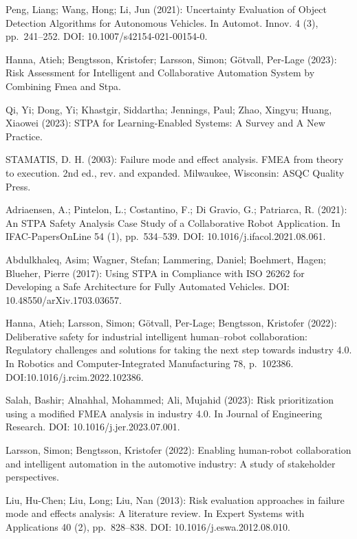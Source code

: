 \begin{thebibliography}{99}
 Peng, Liang; Wang, Hong; Li, Jun (2021): Uncertainty Evaluation of Object Detection Algorithms for Autonomous Vehicles. In Automot. Innov. 4 (3), pp. 241–252. DOI: 10.1007/s42154-021-00154-0.

 Hanna, Atieh; Bengtsson, Kristofer; Larsson, Simon; Götvall, Per-Lage (2023): Risk Assessment for Intelligent and Collaborative Automation System by Combining Fmea and Stpa.

 Qi, Yi; Dong, Yi; Khastgir, Siddartha; Jennings, Paul; Zhao, Xingyu; Huang, Xiaowei (2023): STPA for Learning-Enabled Systems: A Survey and A New Practice.

 STAMATIS, D. H. (2003): Failure mode and effect analysis. FMEA from theory to execution. 2nd ed., rev. and expanded. Milwaukee, Wisconsin: ASQC Quality Press.

 Adriaensen, A.; Pintelon, L.; Costantino, F.; Di Gravio, G.; Patriarca, R. (2021): An STPA Safety Analysis Case Study of a Collaborative Robot Application. In IFAC-PapersOnLine 54 (1), pp. 534–539. DOI: 10.1016/j.ifacol.2021.08.061.

  Abdulkhaleq, Asim; Wagner, Stefan; Lammering, Daniel; Boehmert, Hagen; Blueher, Pierre (2017): Using STPA in Compliance with ISO 26262 for Developing a Safe Architecture for Fully Automated Vehicles. DOI: 10.48550/arXiv.1703.03657.

 Hanna, Atieh; Larsson, Simon; Götvall, Per-Lage; Bengtsson, Kristofer (2022): Deliberative safety for industrial intelligent human–robot collaboration: Regulatory challenges and solutions for taking the next step towards industry 4.0. In Robotics and Computer-Integrated Manufacturing 78, p. 102386. DOI:10.1016/j.rcim.2022.102386.

 Salah, Bashir; Alnahhal, Mohammed; Ali, Mujahid (2023): Risk prioritization using a modified FMEA analysis in industry 4.0. In Journal of Engineering Research. DOI: 10.1016/j.jer.2023.07.001.

 Larsson, Simon; Bengtsson, Kristofer (2022): Enabling human-robot collaboration and intelligent automation in the automotive industry: A study of stakeholder perspectives.

 Liu, Hu-Chen; Liu, Long; Liu, Nan (2013): Risk evaluation approaches in failure mode and effects analysis: A literature review. In Expert Systems with Applications 40 (2), pp. 828–838. DOI: 10.1016/j.eswa.2012.08.010.


\end{thebibliography}
